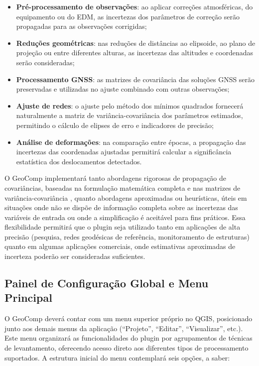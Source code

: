 \documentclass[
        12pt,                           %
        openright,                      %
        oneside,
        a4paper,                        %
        chapter=TITLE,         %
        section=TITLE,         %
        subsection=Title,      %
        english,                        %
        portugues,                      %
        ]{abntex2}
\begin{document}
\begin{itemize}
    \item \textbf{Pré-processamento de observações}: ao aplicar correções atmosféricas, do equipamento ou do EDM, as incertezas dos parâmetros de correção serão propagadas para as observações corrigidas;
    \item \textbf{Reduções geométricas}: nas reduções de distâncias ao elipsoide, ao plano de projeção ou entre diferentes alturas, as incertezas das altitudes e coordenadas serão consideradas;
    \item \textbf{Processamento GNSS}: as matrizes de covariância das soluções GNSS serão preservadas e utilizadas no ajuste combinado com outras observações;
    \item \textbf{Ajuste de redes}: o ajuste pelo método dos mínimos quadrados fornecerá naturalmente a matriz de variância-covariância dos parâmetros estimados, permitindo o cálculo de elipses de erro e indicadores de precisão;
    \item \textbf{Análise de deformações}: na comparação entre épocas, a propagação das incertezas das coordenadas ajustadas permitirá calcular a significância estatística dos deslocamentos detectados.
\end{itemize}

O GeoComp implementará tanto abordagens rigorosas de propagação de covariâncias, baseadas na formulação matemática completa e nas matrizes de variância-covariância \cite{Ghilani2010}, quanto abordagens aproximadas ou heurísticas, úteis em situações onde não se dispõe de informação completa sobre as incertezas das variáveis de entrada ou onde a simplificação é aceitável para fins práticos. Essa flexibilidade permitirá que o plugin seja utilizado tanto em aplicações de alta precisão (pesquisa, redes geodésicas de referência, monitoramento de estruturas) quanto em algumas aplicações comerciais, onde estimativas aproximadas de incerteza poderão ser consideradas suficientes.

\subsection{Painel de Configuração Global e Menu Principal}

O GeoComp deverá contar com um menu superior próprio no QGIS, posicionado junto aos demais menus da aplicação (``Projeto'', ``Editar'', ``Visualizar'', etc.). Este menu organizará as funcionalidades do plugin por agrupamentos de técnicas de levantamento, oferecendo acesso direto aos diferentes tipos de processamento suportados. A estrutura inicial do menu contemplará seis opções, a saber:
\end{document}
